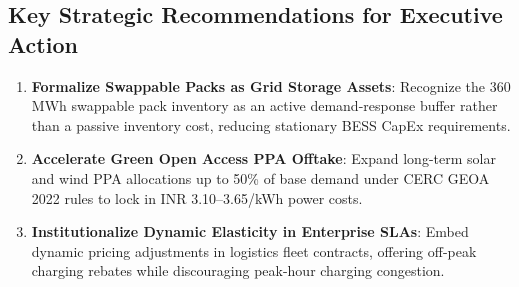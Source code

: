 \documentclass[10.5pt,a4paper]{article}
\begin{document}
\subsection{Key Strategic Recommendations for Executive Action}
\begin{enumerate}[noitemsep]
    \item \textbf{Formalize Swappable Packs as Grid Storage Assets}: Recognize the 360 MWh swappable pack inventory as an active demand-response buffer rather than a passive inventory cost, reducing stationary BESS CapEx requirements.
    \item \textbf{Accelerate Green Open Access PPA Offtake}: Expand long-term solar and wind PPA allocations up to 50\% of base demand under CERC GEOA 2022 rules to lock in INR 3.10--3.65/kWh power costs.
    \item \textbf{Institutionalize Dynamic Elasticity in Enterprise SLAs}: Embed dynamic pricing adjustments in logistics fleet contracts, offering off-peak charging rebates while discouraging peak-hour charging congestion.
\end{enumerate}
\end{document}
